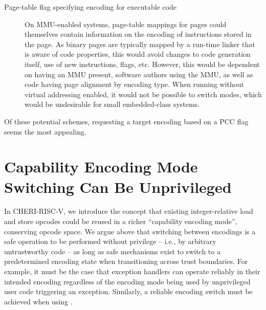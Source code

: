 \begin{description}
\item[Page-table flag specifying encoding for executable code]
  On MMU-enabled systems, page-table mappings for pages could themselves
  contain information on the encoding of instructions stored in the page.
  As binary pages are typically mapped by a run-time linker that is aware of
  code properties, this would avoid changes to code generation itself, use of
  new instructions, flags, etc.
  However, this would be dependent on having an MMU present, software authors
  using the MMU, as well as code having page alignment by encoding type.
  When running without virtual addressing enabled, it would not be possible to
  switch modes, which would be undesirable for small embedded-class systems.
\end{description}


Of these potential schemes, requesting a target encoding based on a PCC flag
seems the most appealing.


\section{Capability Encoding Mode Switching Can Be Unprivileged}
\label{section-capability-encoding-mode-unprivileged}

In CHERI-RISC-V, we introduce the concept that existing integer-relative load
and store opcodes could be reused in a richer ``capability encoding mode'',
conserving opcode space.
We argue
above
that switching between encodings is a safe operation to be performed
without privilege -- i.e., by arbitrary untrustworthy code -- as long as safe
mechanisms exist to switch to a predetermined encoding state when
transitioning across trust boundaries.
For example, it must be the case that exception handlers can operate reliably
in their intended encoding regardless of the encoding mode being used by
unprivileged user code triggering an exception.
Similarly, a reliable encoding switch must be achieved when using
.

